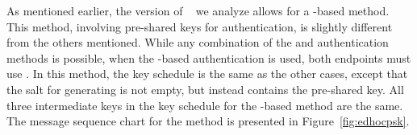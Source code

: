 \documentclass[runningheads, envcountsame, hidelinks, a4paper, draft, x11names]{llncs}
\begin{document}
As mentioned earlier, the version of
\mEdhoc{}~\cite{our-analysis-selander-lake-edhoc-00} we analyze allows for a
\mPsk{}-based method.
%
This method, involving pre-shared keys for authentication, is slightly different from the others mentioned.
%
While any combination of the \mSig{} and \mStat{} authentication methods is
possible, when the \mPsk{}-based authentication is used, both endpoints must
use \mPsk{}.
In this method, the key schedule is the same as the other cases, except that the
salt for generating \mPRKtwo{} is not empty, but instead contains the
pre-shared key.
%
All three intermediate keys in the key schedule for the \mPsk{}-based method
are the same.
%
The message sequence chart for the \mPsk{} method is presented in
Figure~\ref{fig:edhocpsk}.

\end{document}
